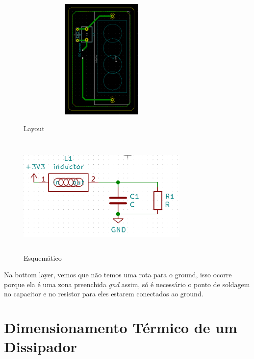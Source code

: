 \begin{figure}[!htb]
    \begin{minipage}{0.5\textwidth}
    \centering
    \includegraphics[height = 6cm,width = 0.75\textwidth]{PCB_3.png}
    \caption{Layout}
    \end{minipage}\hfill
    \begin{minipage}{0.5\textwidth}
    \centering
    \includegraphics[height = 6cm,width = 0.75\textwidth]{PCB_4.png}
    \caption{Esquemático}
    \end{minipage}\hfill
\end{figure}

\clearpage
Na bottom layer, vemos que não temos uma rota para o ground, isso ocorre porque ela é uma zona preenchida \textit{gnd} assim, só é necessário o ponto de soldagem no capacitor e no resistor para eles estarem conectados ao ground.

%
%
\chapter{Dimensionamento Térmico de um Dissipador}

